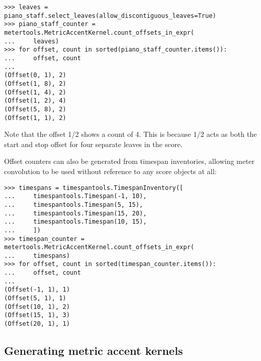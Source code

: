 \begin{singlespacing}
\vspace{-0.5\baselineskip}
\begin{lstlisting}
>>> leaves = piano_staff.select_leaves(allow_discontiguous_leaves=True)
>>> piano_staff_counter = metertools.MetricAccentKernel.count_offsets_in_expr(
...     leaves)
>>> for offset, count in sorted(piano_staff_counter.items()):
...     offset, count
...
(Offset(0, 1), 2)
(Offset(1, 8), 2)
(Offset(1, 4), 2)
(Offset(1, 2), 4)
(Offset(5, 8), 2)
(Offset(1, 1), 2)
\end{lstlisting}
\end{singlespacing}

\noindent Note that the offset 1/2 shows a count of 4. This is because 1/2 acts
as both the start and stop offset for four separate leaves in the score.

Offset counters can also be generated from timespan inventories, allowing meter
convolution to be used without reference to any score objects at all:

\begin{comment}
<abjad>
timespans = timespantools.TimespanInventory([
    timespantools.Timespan(-1, 10),
    timespantools.Timespan(5, 15),
    timespantools.Timespan(15, 20),
    timespantools.Timespan(10, 15),
    ])
timespan_counter = metertools.MetricAccentKernel.count_offsets_in_expr(
    timespans)
for offset, count in sorted(timespan_counter.items()):
    offset, count

</abjad>
\end{comment}

\begin{singlespacing}
\vspace{-0.5\baselineskip}
\begin{lstlisting}
>>> timespans = timespantools.TimespanInventory([
...     timespantools.Timespan(-1, 10),
...     timespantools.Timespan(5, 15),
...     timespantools.Timespan(15, 20),
...     timespantools.Timespan(10, 15),
...     ])
>>> timespan_counter = metertools.MetricAccentKernel.count_offsets_in_expr(
...     timespans)
>>> for offset, count in sorted(timespan_counter.items()):
...     offset, count
...
(Offset(-1, 1), 1)
(Offset(5, 1), 1)
(Offset(10, 1), 2)
(Offset(15, 1), 3)
(Offset(20, 1), 1)
\end{lstlisting}
\end{singlespacing}

\subsection{Generating metric accent kernels} %


